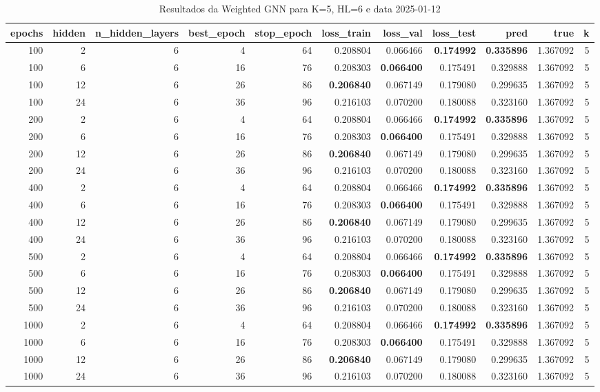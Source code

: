 \begin{table}
\caption{Resultados da Weighted GNN para K=5, HL=6 e data 2025-01-12}
\label{tab:weighted_gnn_results_k5_hl6_d20250112}
\begin{tabular}{rrrrrrrrrrr}
\toprule
epochs & hidden & n\_hidden\_layers & best\_epoch & stop\_epoch & loss\_train & loss\_val & loss\_test & pred & true & k \\
\midrule
100 & 2 & 6 & 4 & 64 & 0.208804 & 0.066466 & \textbf{0.174992} & \textbf{0.335896} & 1.367092 & 5 \\
100 & 6 & 6 & 16 & 76 & 0.208303 & \textbf{0.066400} & 0.175491 & 0.329888 & 1.367092 & 5 \\
100 & 12 & 6 & 26 & 86 & \textbf{0.206840} & 0.067149 & 0.179080 & 0.299635 & 1.367092 & 5 \\
100 & 24 & 6 & 36 & 96 & 0.216103 & 0.070200 & 0.180088 & 0.323160 & 1.367092 & 5 \\
200 & 2 & 6 & 4 & 64 & 0.208804 & 0.066466 & \textbf{0.174992} & \textbf{0.335896} & 1.367092 & 5 \\
200 & 6 & 6 & 16 & 76 & 0.208303 & \textbf{0.066400} & 0.175491 & 0.329888 & 1.367092 & 5 \\
200 & 12 & 6 & 26 & 86 & \textbf{0.206840} & 0.067149 & 0.179080 & 0.299635 & 1.367092 & 5 \\
200 & 24 & 6 & 36 & 96 & 0.216103 & 0.070200 & 0.180088 & 0.323160 & 1.367092 & 5 \\
400 & 2 & 6 & 4 & 64 & 0.208804 & 0.066466 & \textbf{0.174992} & \textbf{0.335896} & 1.367092 & 5 \\
400 & 6 & 6 & 16 & 76 & 0.208303 & \textbf{0.066400} & 0.175491 & 0.329888 & 1.367092 & 5 \\
400 & 12 & 6 & 26 & 86 & \textbf{0.206840} & 0.067149 & 0.179080 & 0.299635 & 1.367092 & 5 \\
400 & 24 & 6 & 36 & 96 & 0.216103 & 0.070200 & 0.180088 & 0.323160 & 1.367092 & 5 \\
500 & 2 & 6 & 4 & 64 & 0.208804 & 0.066466 & \textbf{0.174992} & \textbf{0.335896} & 1.367092 & 5 \\
500 & 6 & 6 & 16 & 76 & 0.208303 & \textbf{0.066400} & 0.175491 & 0.329888 & 1.367092 & 5 \\
500 & 12 & 6 & 26 & 86 & \textbf{0.206840} & 0.067149 & 0.179080 & 0.299635 & 1.367092 & 5 \\
500 & 24 & 6 & 36 & 96 & 0.216103 & 0.070200 & 0.180088 & 0.323160 & 1.367092 & 5 \\
1000 & 2 & 6 & 4 & 64 & 0.208804 & 0.066466 & \textbf{0.174992} & \textbf{0.335896} & 1.367092 & 5 \\
1000 & 6 & 6 & 16 & 76 & 0.208303 & \textbf{0.066400} & 0.175491 & 0.329888 & 1.367092 & 5 \\
1000 & 12 & 6 & 26 & 86 & \textbf{0.206840} & 0.067149 & 0.179080 & 0.299635 & 1.367092 & 5 \\
1000 & 24 & 6 & 36 & 96 & 0.216103 & 0.070200 & 0.180088 & 0.323160 & 1.367092 & 5 \\
\bottomrule
\end{tabular}
\end{table}

